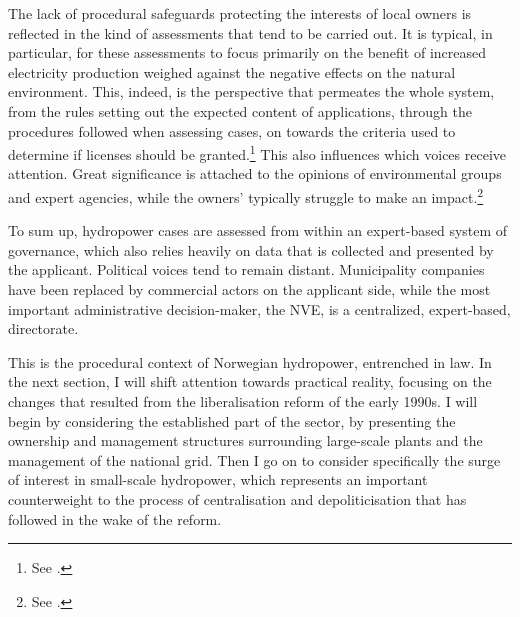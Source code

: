The lack of procedural safeguards protecting the interests of local owners is reflected in the kind of assessments that tend to be carried out. It is typical, in particular, for these assessments to focus primarily on the benefit of increased electricity production weighed against the negative effects on the natural environment. This, indeed, is the perspective that permeates the whole system, from the rules setting out the expected content of applications, through the procedures followed when assessing cases, on towards the criteria used to determine if licenses should be granted.\footnote{See \cite{stokker10}.} This also influences which voices receive attention. Great significance is attached to the opinions of environmental groups and expert agencies, while the owners' typically struggle to make an impact.\footnote{See \cite{jorpeland11}.}

To sum up, hydropower cases are assessed from within an expert-based system of governance, which also relies heavily on data that is collected and presented by the applicant. Political voices tend to remain distant. Municipality companies have been replaced by commercial actors on the applicant side, while the most important administrative decision-maker, the NVE, is a centralized, expert-based, directorate.

This is the procedural context of Norwegian hydropower, entrenched in law. In the next section, I will shift attention towards practical reality, focusing on the changes that resulted from the liberalisation reform of the early 1990s. I will begin by considering the established part of the sector, by presenting the ownership and management structures surrounding large-scale plants and the management of the national grid. Then I go on to consider specifically the surge of interest in small-scale hydropower, which represents an important counterweight to the process of centralisation and depoliticisation that has followed in the wake of the reform.

%
%
%
%
%
%

